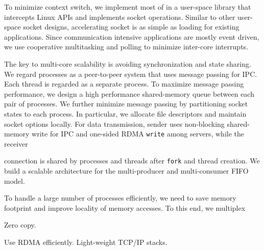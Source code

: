 To minimize context switch, we implement most of \sys{} in a user-space library \libipc{} that intercepts Linux APIs and implements socket operations. Similar to other user-space socket designs, accelerating socket is as simple as loading \libipc{} for existing applications. Since communication intensive applications are mostly event driven, we use cooperative multitasking and polling to minimize inter-core interrupts.

The key to multi-core scalability is avoiding synchronization and state sharing. We regard processes as a peer-to-peer system that uses message passing for IPC. Each thread is regarded as a separate process. To maximize message passing performance, we design a high performance shared-memory queue between each pair of processes. We further minimize message passing by partitioning socket states to each process. In particular, we allocate file descriptors and maintain socket options locally. For data transmission, sender uses non-blocking shared-memory write for IPC and one-sided RDMA \texttt{write} among servers, while the receiver 

connection is shared by processes and threads after \texttt{fork} and thread creation. We build a scalable architecture for the multi-producer and multi-consumer FIFO model.

To handle a large number of processes efficiently, we need to save memory footprint and improve locality of memory accesses. To this end, we multiplex

Zero copy.

Use RDMA efficiently. Light-weight TCP/IP stacks.
